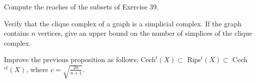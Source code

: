 \noindent\linia

\begin{exercise}
    Compute the reaches of the subsets of Exercise 39.
\end{exercise}

\noindent\linia

\begin{exercise}
    Verify that the clique complex of a graph is a simplicial complex. If the
    graph contains $n$ vertices, give an upper bound on the number of
    simplices of the clique complex.
\end{exercise}

\noindent\linia

\begin{exercise}
    Improve the previous proposition as follows: Cech$^t(X) \subset $
    Rips$^t(X) \subset $ Cech$^{ct}(X)$, where $c = \sqrt{\frac{2n}{n+1}}$.
\end{exercise}

\newpage